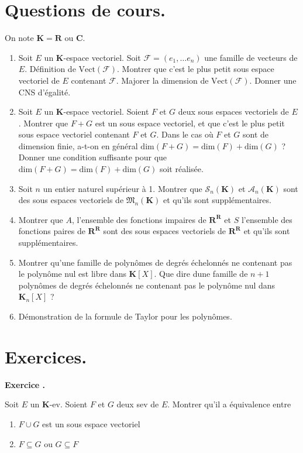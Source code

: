 \documentclass[twocolumn, landscape, french]{article}
\newcounter{exercice}
\newenvironment{exo}{
	\refstepcounter{exercice}
	\textbf{Exercice \theexercice.}
	\quad
}{
	\medskip
}
\newcommand{\R}{\mathbf{R}}
\newcommand{\C}{\mathbf{C}}
\newcommand{\F}{\mathcal{F}}
\newcommand{\K}{\mathbf{K}}
\newcommand{\Vect}[1]{\mathrm{Vect}\left( #1\right)}
\renewcommand{\dim}[1]{\mathrm{dim}\left( #1\right)}
\begin{document}
	
	\section*{Questions de cours.}
	On note $\K = \R$ ou $\C$.
	\begin{enumerate}
		\item Soit $E$ un $\K$-espace vectoriel. Soit $\F = (e_1, \dots e_n)$ une famille de vecteurs de $E$. Définition de $\Vect{\F}$. Montrer que c'est le plus petit sous espace vectoriel de $E$ contenant $\F$. Majorer la dimension de $\Vect{\F}$. Donner une CNS d'égalité.
		\item Soit $E$ un $\K$-espace vectoriel. Soient $F$ et $G$ deux sous espaces vectoriels de $E$. Montrer que $F+G$ est un sous espace vectoriel, et que c'est le plus petit sous espace vectoriel contenant $F$ et $G$. Dans le cas où $F$ et $G$ sont de dimension finie, a-t-on en général $\dim{F+G}=\dim{F}+\dim{G}$ ? Donner une condition suffisante pour que $\dim{F+G}=\dim{F}+\dim{G}$  soit réalisée.
		\item Soit $n$ un entier naturel supérieur à 1. Montrer que $\mathcal{S}_n(\K)$ et $\mathcal{A}_n(\K)$ sont des sous espaces vectoriels de $\mathfrak{M}_n(\K)$ et qu'ils sont supplémentaires.
		\item Montrer que $A$, l'ensemble des fonctions impaires de $\R^\R$ et $S$ l'ensemble des fonctions paires de $\R^\R$ sont des sous espaces vectoriels de $\R^\R$ et qu'ils sont supplémentaires.
		\item Montrer qu'une famille de polynômes de degrés échelonnés ne contenant pas le polynôme nul est libre dans $\K[X]$. Que dire dune famille de $n+1$ polynômes de degrés échelonnés ne contenant pas le polynôme nul dans $\K_{n}[X]$ ?
		\item Démonstration de la formule de Taylor pour les polynômes.
	\end{enumerate}
	
	\section*{Exercices.}
	
	\begin{exo}
		Soit $E$ un $\K$-ev. Soient $F$ et $G$ deux sev de $E$. Montrer qu'il a équivalence entre
		\begin{enumerate}[label=(\roman*)]
			\item $F \cup G$ est un sous espace vectoriel
			\item $F \subseteq G$ ou $G \subseteq F$
		\end{enumerate}
	\end{exo}
	
\end{document}
